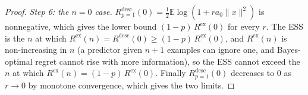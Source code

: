 \documentclass[10pt]{article}
\newcommand{\E}{\mathbb{E}}
\begin{document}
\begin{proof}
\emph{Step 6: the $n = 0$ case.} $R^{\mathrm{desc}}_{p=1}(0) = \tfrac12 \E \log(1 + r a_0 \|x\|^2)$ is nonnegative, which gives the lower bound $(1-p)\,R^{\mathrm{ex}}(0)$ for every $r$. The ESS is the $n$ at which $R^{\mathrm{ex}}(n) = R^{\mathrm{desc}}(0) \ge (1-p)\,R^{\mathrm{ex}}(0)$, and $R^{\mathrm{ex}}(n)$ is non-increasing in $n$ (a predictor given $n + 1$ examples can ignore one, and Bayes-optimal regret cannot rise with more information), so the ESS cannot exceed the $n$ at which $R^{\mathrm{ex}}(n) = (1-p)\,R^{\mathrm{ex}}(0)$. Finally $R^{\mathrm{desc}}_{p=1}(0)$ decreases to $0$ as $r \to 0$ by monotone convergence, which gives the two limits.
\end{proof}
\end{document}
